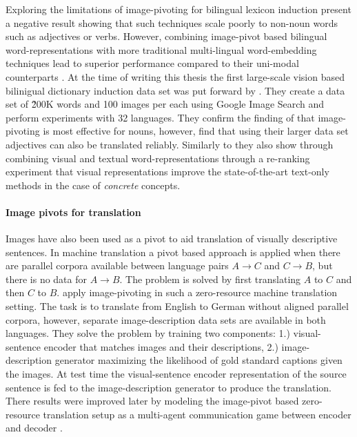 Exploring the limitations of image-pivoting for bilingual lexicon induction
\cite{hartmann2017limitations} present a negative result
showing that such techniques scale poorly to non-noun words such as
adjectives or verbs. However, combining image-pivot based bilingual
word-representations with more traditional multi-lingual word-embedding
techniques lead to superior performance compared to their uni-modal
counterparts \cite{vulic2016multi}. At the time of writing this thesis
the first large-scale vision based bilinigual dictionary induction data set
was put forward by \cite{hewitt2018learning}. They create a data set
of \~200K words and 100 images per each using Google Image Search and perform
experiments with 32 languages.
They confirm the finding of \cite{hartmann2017limitations} that image-pivoting
is most effective for nouns, however, find that using their larger data set
adjectives can also be translated reliably. Similarly to \cite{vulic2016multi}
they also show through combining
visual and textual word-representations through a re-ranking
experiment that visual representations improve the state-of-the-art
text-only methods in the case of \emph{concrete} concepts.

\paragraph{Image pivots for translation}
Images have also been used as a pivot to aid translation of visually
descriptive sentences. In machine translation a pivot based approach is applied
when there are parallel corpora available between language pairs $A\rightarrow C$
and $C \rightarrow B$, but there is no data for $A\rightarrow B$. The problem is
solved by first translating $A$ to $C$ and then $C$ to $B$.
\cite{nakayama2017zero} apply image-pivoting in such a zero-resource machine
translation setting. The task is to translate from English to German without
aligned parallel corpora, however, separate image-description data sets are
available in both languages. They solve the problem by
training two components: 1.) visual-sentence encoder that matches images and their descriptions,
2.) image-description generator maximizing the likelihood of gold standard captions given the images.
At test time the visual-sentence encoder representation of the source sentence is fed to the
image-description generator to produce the translation.
There results were improved later by modeling
the image-pivot based zero-resource translation setup as a
multi-agent communication game between encoder and decoder
\cite{chen2018zero,lee2017emergent}.


